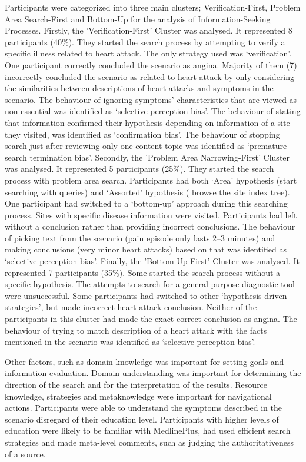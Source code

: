 \documentclass[]{article}
\begin{document}
Participants were categorized into three main clusters; Verification-First, Problem Area Search-First and Bottom-Up for the analysis of Information-Seeking Processes. Firstly, the 'Verification-First' Cluster was analysed. It represented 8 participants (40\%). They started the search process by attempting to verify a specific illness related to heart attack. The only strategy used was ‘verification’. One participant correctly concluded the scenario as angina. Majority of them (7) incorrectly concluded the scenario as related to heart attack by only considering the similarities between descriptions of heart attacks and symptoms in the scenario. The behaviour of ignoring symptoms’ characteristics that are viewed as non-essential was identified as ‘selective perception bias’. The behaviour of stating that information confirmed their hypothesis depending on information of a site they visited, was identified as ‘confirmation bias’. The behaviour of stopping search just after reviewing only one content topic was identified as ‘premature search termination bias’. Secondly, the 'Problem Area Narrowing-First' Cluster was analysed. It represented 5 participants (25\%). They started the search process with problem area search. Participants had both ‘Area’ hypothesis (start searching with queries) and ‘Assorted’ hypothesis ( browse the site index tree). One participant had switched to a ‘bottom-up’ approach during this searching process. Sites with specific disease information were visited. Participants had left without a conclusion rather than providing incorrect conclusions. The behaviour of picking text from the scenario (pain episode only lasts 2–3 minutes) and making conclusions (very minor heart attacks) based on that was identified as ‘selective perception bias'. Finally, the 'Bottom-Up First' Cluster was analysed. It represented 7 participants (35\%). Some started the search process without a specific hypothesis. The attempts to search for a general-purpose diagnostic tool were unsuccessful. Some participants had  switched to other ‘hypothesis-driven strategies’, but made incorrect heart attack conclusion. Neither of the participants in this cluster had made the exact correct conclusion as angina. The behaviour of trying to match description of a heart attack with the facts mentioned in the scenario was identified as ‘selective perception bias’.                      

Other factors, such as domain knowledge was important for setting goals and information evaluation. Domain understanding was important for determining the direction of the search and for the interpretation of the results. Resource knowledge, strategies and metaknowledge were important for navigational actions. Participants were able to understand the symptoms described in the scenario disregard of their education level. Participants with higher levels of education were likely to be familiar with MedlinePlus, had used efficient search strategies and made meta-level comments, such as judging the authoritativeness of a source.
\end{document}

